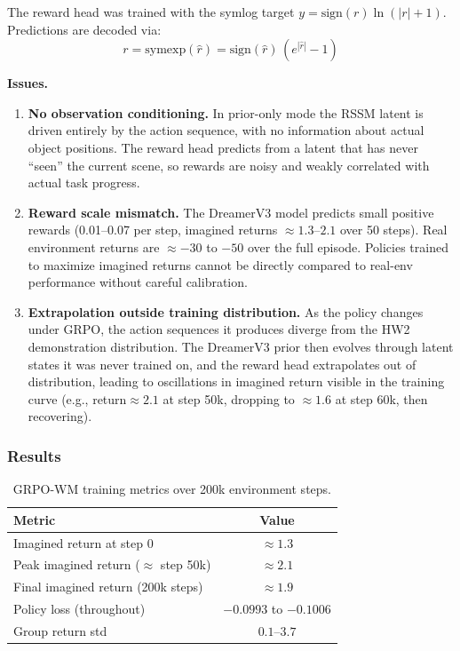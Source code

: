 \documentclass[11pt,letterpaper]{article}
\begin{document}
The reward head was trained with the symlog target $y = \text{sign}(r)\ln(|r|+1)$. Predictions are decoded via:
\[
  r = \text{symexp}(\hat{r}) = \text{sign}(\hat{r})\,(e^{|\hat{r}|}-1)
\]

\textbf{Issues.}
\begin{enumerate}
  \item \textbf{No observation conditioning.} In prior-only mode the RSSM latent is driven entirely by the action sequence, with no information about actual object positions. The reward head predicts from a latent that has never ``seen'' the current scene, so rewards are noisy and weakly correlated with actual task progress.

  \item \textbf{Reward scale mismatch.} The DreamerV3 model predicts small positive rewards (0.01--0.07 per step, imagined returns $\approx 1.3$--$2.1$ over 50 steps). Real environment returns are $\approx -30$ to $-50$ over the full episode. Policies trained to maximize imagined returns cannot be directly compared to real-env performance without careful calibration.

  \item \textbf{Extrapolation outside training distribution.} As the policy changes under GRPO, the action sequences it produces diverge from the HW2 demonstration distribution. The DreamerV3 prior then evolves through latent states it was never trained on, and the reward head extrapolates out of distribution, leading to oscillations in imagined return visible in the training curve (e.g., return$\approx 2.1$ at step 50k, dropping to $\approx 1.6$ at step 60k, then recovering).
\end{enumerate}

\subsubsection{Results}

\begin{table}[h]
\centering
\begin{tabular}{lc}
\toprule
Metric & Value \\
\midrule
Imagined return at step 0 & $\approx 1.3$ \\
Peak imagined return ($\approx$ step 50k) & $\approx 2.1$ \\
Final imagined return (200k steps) & $\approx 1.9$ \\
Policy loss (throughout) & $-0.0993$ to $-0.1006$ \\
Group return std & $0.1$--$3.7$ \\
\bottomrule
\end{tabular}
\caption{GRPO-WM training metrics over 200k environment steps.}
\end{table}
\end{document}
